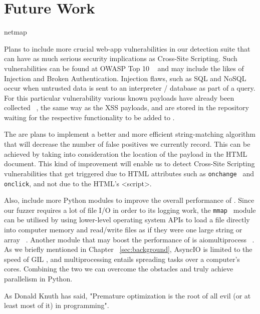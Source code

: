 \chapter{Future Work}
\label{sec:futurework}
\minitoc
\vspace*{1cm}


netmap

Plans to include more crucial web-app vulnerabilities in our detection suite that can have as much serious security implications as Cross-Site Scripting. Such vulnerabilities can be found at OWASP Top 10 ~\cite{owasp2017} and may include the likes of Injection and Broken Authentication.  Injection flaws, such as SQL and NoSQL occur when untrusted data is sent to an interpreter / database as part of a query. For this particular vulnerability various known payloads have already been collected ~\cite{seclist}, the same way as the XSS payloads, and are stored in the repository waiting for the respective functionality to be added to \pname{}.

The are plans to implement a better and more efficient string-matching algorithm that will decrease the number of false positives we currently record. This can be achieved by taking into consideration the location of the payload in the HTML document. This kind of improvement will enable us to detect Cross-Site Scripting vulnerabilities that get triggered due to HTML attributes such as {\tt onchange } and {\tt onclick}, and not due to the HTML's <script>.

Also, include more Python modules to improve the overall performance of \pname{}. Since our fuzzer requires a lot of file I/O in order to its logging work, the {\tt mmap } module can be utilised by using lower-level operating system APIs to load a file directly into computer memory and read/write files as if they were one large string or array ~\cite{mmap}. Another module that may boost the performance of \pname{} is aiomultiprocess ~\cite{aiomultiprocess}. As we briefly mentioned in Chapter ~\ref{sec:background}, AsyncIO is limited to the speed of GIL , and multiprocessing entails spreading tasks over a computer's cores. Combining the two we can overcome the obstacles and truly achieve parallelism in Python.

As Donald Knuth has said, "Premature optimization is the root of all evil (or at least most of it) in programming".